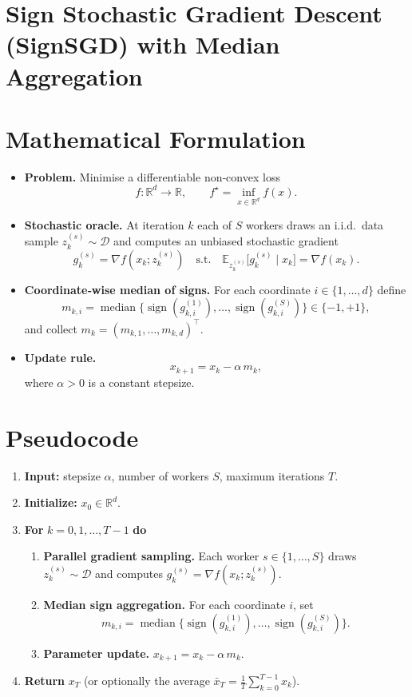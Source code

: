 \documentclass[11pt]{article}
\newcommand{\E}{\mathbb{E}}
\newcommand{\R}{\mathbb{R}}
\newcommand{\sign}{\operatorname{sign}}
\begin{document}
\section*{Sign Stochastic Gradient Descent (SignSGD) with Median Aggregation}

\section*{Mathematical Formulation}
\begin{itemize}
    \item \textbf{Problem.} Minimise a differentiable non‑convex loss 
    \[
        f:\R^{d}\rightarrow\R,\qquad 
        f^{\star}= \inf_{x\in\R^{d}} f(x).
    \]
    \item \textbf{Stochastic oracle.} At iteration $k$ each of $S$ workers draws an i.i.d.\ data sample
    $z^{(s)}_{k}\sim\mathcal{D}$ and computes an unbiased stochastic gradient
    \[
        g^{(s)}_{k}= \nabla f(x_{k};z^{(s)}_{k})\quad\text{s.t.}\quad
        \E_{z^{(s)}_{k}}\!\big[g^{(s)}_{k}\mid x_{k}\big]=\nabla f(x_{k}).
    \]
    \item \textbf{Coordinate‑wise median of signs.} For each coordinate $i\in\{1,\dots,d\}$ define
    \[
        m_{k,i}= \operatorname{median}\big\{\sign(g^{(1)}_{k,i}),\dots,\sign(g^{(S)}_{k,i})\big\}\in\{-1,+1\},
    \]
    and collect $m_{k}=(m_{k,1},\dots,m_{k,d})^{\top}$.
    \item \textbf{Update rule.}
    \[
        x_{k+1}=x_{k}-\alpha\, m_{k},
    \]
    where $\alpha>0$ is a constant stepsize.
\end{itemize}

\section*{Pseudocode}
\begin{enumerate}[leftmargin=*, label=\textbf{Step \arabic*.}]
    \item \textbf{Input:} stepsize $\alpha$, number of workers $S$, maximum iterations $T$.
    \item \textbf{Initialize:} $x_{0}\in\R^{d}$.
    \item \textbf{For} $k=0,1,\dots,T-1$ \textbf{do}
    \begin{enumerate}[label=\roman*.]
        \item \textbf{Parallel gradient sampling.} Each worker $s\in\{1,\dots,S\}$ draws $z^{(s)}_{k}\sim\mathcal{D}$ and computes $g^{(s)}_{k}= \nabla f(x_{k};z^{(s)}_{k})$.
        \item \textbf{Median sign aggregation.} For each coordinate $i$, set 
        \[
            m_{k,i}= \operatorname{median}\big\{\sign(g^{(1)}_{k,i}),\dots,\sign(g^{(S)}_{k,i})\big\}.
        \]
        \item \textbf{Parameter update.} $x_{k+1}=x_{k}-\alpha\, m_{k}$.
    \end{enumerate}
    \item \textbf{Return} $x_{T}$ (or optionally the average $\bar x_{T}= \tfrac1T\sum_{k=0}^{T-1}x_{k}$).
\end{enumerate}
\end{document}
